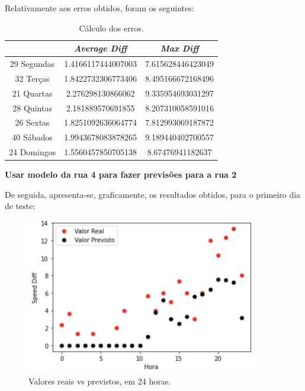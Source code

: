 \documentclass[a4paper, 12pt]{article}
\begin{document}
Relativamente aos erros obtidos, foram os seguintes:

\begin{table}[H]
	\centering
	\begin{tabular}{||c||c|c||}
		\hline\hline
		& \textit{Average Diff} & \textit{Max Diff} \\
		\hline\hline
		29 Segundas & 
1.4166117444007003
 & 7.615628446423049\\
		\hline
		32 Terças  &

1.8422732306773406 & 8.495166672168496 \\
		\hline
		21 Quartas & 2.276298130866062

 & 9.335954693031297 \\
		\hline
		28 Quintas  & 
2.181889570691855
 & 8.207310058591016 \\
		\hline
		26 Sextas & 1.8251092636064774
 & 7.812993069187872 \\
		\hline
		40 Sábados  & 
1.9943678083878265 & 9.189440402700557 \\
		\hline
		24 Domingos & 1.5560457850705138

 & 
8.67476941182637 \\
		\hline\hline
	\end{tabular}
	\label{table:mod4_rua1}
	\caption{Cálculo dos erros.}
\end{table}


\vspace{0.5cm}
\textbf{Usar modelo da rua 4 para fazer previsões para a rua 2}

De seguida, apresenta-se, graficamente, os resultados obtidos, para o primeiro dia de teste:

\begin{figure}[H]
	\centering
	\includegraphics[width=10cm]{resultados/real_prev_mod4_rua2.png}
	\caption{Valores reais vs previstos, em 24 horas.}
\end{figure}
\end{document}

